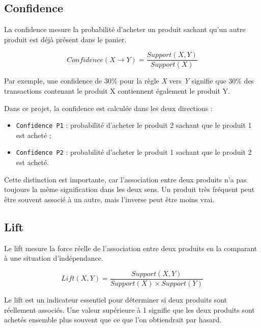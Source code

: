 \documentclass[12pt,a4paper,twoside]{report}
\begin{document}
\subsection{Confidence}

La confidence mesure la probabilité d'acheter un produit sachant qu'un autre produit est déjà présent dans le panier.

\[
Confidence(X \rightarrow Y) = \frac{Support(X,Y)}{Support(X)}
\]

Par exemple, une confidence de 30\% pour la règle \textit{X} vers \textit{Y} signifie que 30\% des transactions contenant le produit X contiennent également le produit Y.

Dans ce projet, la confidence est calculée dans les deux directions :

\begin{itemize}
  \item \texttt{Confidence P1} : probabilité d'acheter le produit 2 sachant que le produit 1 est acheté ;
  \item \texttt{Confidence P2} : probabilité d'acheter le produit 1 sachant que le produit 2 est acheté.
\end{itemize}

Cette distinction est importante, car l'association entre deux produits n'a pas toujours la même signification dans les deux sens. Un produit très fréquent peut être souvent associé à un autre, mais l'inverse peut être moins vrai.

\subsection{Lift}

Le lift mesure la force réelle de l'association entre deux produits en la comparant à une situation d'indépendance.

\[
Lift(X,Y) = \frac{Support(X,Y)}{Support(X) \times Support(Y)}
\]

Le lift est un indicateur essentiel pour déterminer si deux produits sont réellement associés. Une valeur supérieure à 1 signifie que les deux produits sont achetés ensemble plus souvent que ce que l'on obtiendrait par hasard.
\end{document}
